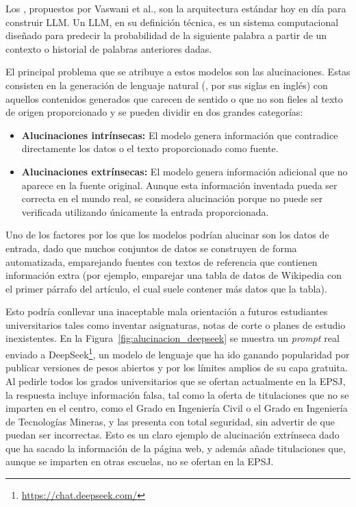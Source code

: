 Los , propuestos por Vaswani et al.\cite{vaswani2017attention}, son la arquitectura estándar hoy en día para construir LLM. Un LLM, en su definición técnica, es un sistema computacional diseñado para predecir la probabilidad de la siguiente palabra a partir de un contexto o historial de palabras anteriores dadas.

El principal problema que se atribuye a estos modelos son las alucinaciones. Estas consisten en la generación de lenguaje natural (, por sus siglas en inglés) con aquellos contenidos generados que carecen de sentido o que no son fieles al texto de origen proporcionado y se pueden dividir en dos grandes categorías\cite{ji2023hallucination}:

\begin{itemize}                                        
  \item \textbf{Alucinaciones intrínsecas:} El modelo genera información que contradice directamente los datos o el texto proporcionado como fuente.
  \item \textbf{Alucinaciones extrínsecas:} El modelo genera información adicional que no aparece en la fuente original. Aunque esta información inventada pueda ser correcta en el mundo real, se considera alucinación porque no puede ser verificada utilizando únicamente la entrada proporcionada.
\end{itemize}

Uno de los factores por los que los modelos podrían alucinar son los datos de entrada, dado que muchos conjuntos de datos se construyen de forma automatizada, emparejando fuentes con textos de referencia que contienen información extra (por ejemplo, emparejar una tabla de datos de Wikipedia con el primer párrafo del artículo, el cual suele contener más datos que la tabla)\cite{ji2023hallucination}.

Esto podría conllevar una inaceptable mala orientación a futuros estudiantes universitarios tales como inventar asignaturas, notas de corte o planes de estudio inexistentes. En la Figura~\ref{fig:alucinacion_deepseek} se muestra un \textit{prompt} real enviado a DeepSeek\footnote{\url{https://chat.deepseek.com/}}, un modelo de lenguaje que ha ido ganando popularidad por publicar versiones de pesos abiertos y por los límites amplios de su capa gratuita. Al pedirle todos los grados universitarios que se ofertan actualmente en la EPSJ, la respuesta incluye información falsa, tal como la oferta de titulaciones que no se imparten en el centro, como el Grado en Ingeniería Civil o el Grado en Ingeniería de Tecnologías Mineras, y las presenta con total seguridad, sin advertir de que puedan ser incorrectas. Esto es un claro ejemplo de alucinación extrínseca dado que ha sacado la información de la página web, y además añade titulaciones que, aunque se imparten en otras escuelas, no se ofertan en la EPSJ.

